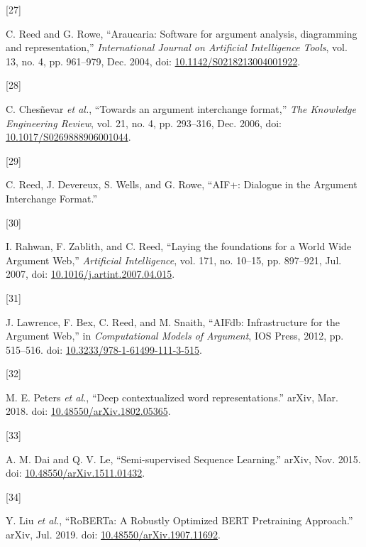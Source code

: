 \documentclass[twocolumn]{article}
\newlength{\cslhangindent}
\newlength{\csllabelwidth}
\newenvironment{CSLReferences}[2] %
 {\begin{list}{}{%
  \setlength{\itemindent}{0pt}
  \setlength{\leftmargin}{0pt}
  \setlength{\parsep}{0pt}
  \ifodd #1
   \setlength{\leftmargin}{\cslhangindent}
   \setlength{\itemindent}{-1\cslhangindent}
  \fi
  \setlength{\itemsep}{#2\baselineskip}}}
 {\end{list}}
\newcommand{\CSLLeftMargin}[1]{\parbox[t]{\csllabelwidth}{\strut#1\strut}}
\newcommand{\CSLRightInline}[1]{\parbox[t]{\linewidth - \csllabelwidth}{\strut#1\strut}}
\begin{document}
\begin{CSLReferences}{0}{0}
\CSLLeftMargin{{[}27{]} }%
\CSLRightInline{C. Reed and G. Rowe, {``Araucaria: Software for argument
analysis, diagramming and representation,''} \emph{International Journal
on Artificial Intelligence Tools}, vol. 13, no. 4, pp. 961--979, Dec.
2004, doi:
\href{https://doi.org/10.1142/S0218213004001922}{10.1142/S0218213004001922}.}

\CSLLeftMargin{{[}28{]} }%
\CSLRightInline{C. Chesñevar \emph{et al.}, {``Towards an argument
interchange format,''} \emph{The Knowledge Engineering Review}, vol. 21,
no. 4, pp. 293--316, Dec. 2006, doi:
\href{https://doi.org/10.1017/S0269888906001044}{10.1017/S0269888906001044}.}

\CSLLeftMargin{{[}29{]} }%
\CSLRightInline{C. Reed, J. Devereux, S. Wells, and G. Rowe, {``{AIF}+:
{Dialogue} in the {Argument Interchange Format}.''}}

\CSLLeftMargin{{[}30{]} }%
\CSLRightInline{I. Rahwan, F. Zablith, and C. Reed, {``Laying the
foundations for a {World Wide Argument Web},''} \emph{Artificial
Intelligence}, vol. 171, no. 10--15, pp. 897--921, Jul. 2007, doi:
\href{https://doi.org/10.1016/j.artint.2007.04.015}{10.1016/j.artint.2007.04.015}.}

\CSLLeftMargin{{[}31{]} }%
\CSLRightInline{J. Lawrence, F. Bex, C. Reed, and M. Snaith, {``{AIFdb}:
{Infrastructure} for the {Argument Web},''} in \emph{Computational
{Models} of {Argument}}, IOS Press, 2012, pp. 515--516. doi:
\href{https://doi.org/10.3233/978-1-61499-111-3-515}{10.3233/978-1-61499-111-3-515}.}

\CSLLeftMargin{{[}32{]} }%
\CSLRightInline{M. E. Peters \emph{et al.}, {``Deep contextualized word
representations.''} arXiv, Mar. 2018. doi:
\href{https://doi.org/10.48550/arXiv.1802.05365}{10.48550/arXiv.1802.05365}.}

\CSLLeftMargin{{[}33{]} }%
\CSLRightInline{A. M. Dai and Q. V. Le, {``Semi-supervised {Sequence
Learning}.''} arXiv, Nov. 2015. doi:
\href{https://doi.org/10.48550/arXiv.1511.01432}{10.48550/arXiv.1511.01432}.}

\CSLLeftMargin{{[}34{]} }%
\CSLRightInline{Y. Liu \emph{et al.}, {``{RoBERTa}: {A Robustly
Optimized BERT Pretraining Approach}.''} arXiv, Jul. 2019. doi:
\href{https://doi.org/10.48550/arXiv.1907.11692}{10.48550/arXiv.1907.11692}.}


\end{CSLReferences}
\end{document}
